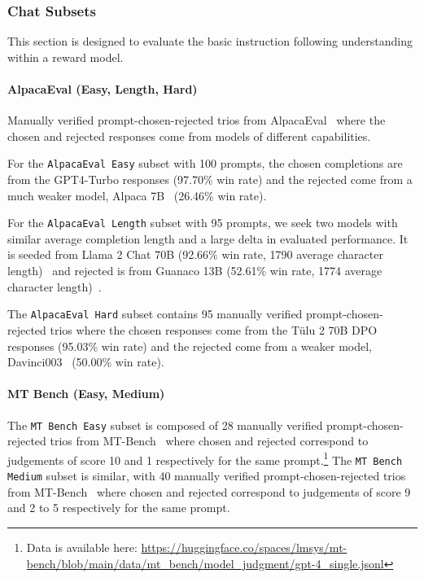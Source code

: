 \begin{appendices}
\subsubsection{Chat Subsets}

This section is designed to evaluate the basic instruction following understanding within a reward model.
\paragraph{AlpacaEval (Easy, Length, Hard)}
Manually verified prompt-chosen-rejected trios from AlpacaEval~\citep{alpaca_eval} where the chosen and rejected responses come from models of different capabilities. 

For the \texttt{AlpacaEval Easy} subset with 100 prompts, the chosen completions are from the GPT4-Turbo responses (97.70\% win rate) and the rejected come from a much weaker model, Alpaca 7B~\citep{alpaca} (26.46\% win rate).

For the \texttt{AlpacaEval Length} subset with 95 prompts, we seek two models with similar average completion length and a large delta in evaluated performance.
It is seeded from Llama 2 Chat 70B (92.66\% win rate, 1790
 average character length)~\citep{touvron2023llama} and rejected is from Guanaco 13B (52.61\% win rate, 1774 average character length)~\citep{dettmers2023qlora}.

The \texttt{AlpacaEval Hard} subset contains 95 manually verified prompt-chosen-rejected trios where the chosen responses come from the T\"ulu 2 70B DPO responses (95.03\% win rate) and the rejected come from a weaker model, Davinci003~\citep{ouyang2022training} (50.00\% win rate).
 
\paragraph{MT Bench (Easy, Medium)}
The \texttt{MT Bench Easy} subset is composed of 28 manually verified prompt-chosen-rejected trios from MT-Bench~\citep{zheng2023judging} where chosen and rejected correspond to judgements of score 10 and 1 respectively for the same prompt.\footnote{Data is available here: \url{https://huggingface.co/spaces/lmsys/mt-bench/blob/main/data/mt_bench/model_judgment/gpt-4_single.jsonl}}
The \texttt{MT Bench Medium} subset is similar, with 40 manually verified prompt-chosen-rejected trios from MT-Bench~\citep{zheng2023judging} where chosen and rejected correspond to judgements of score 9 and 2 to 5 respectively for the same prompt.


\end{appendices}

